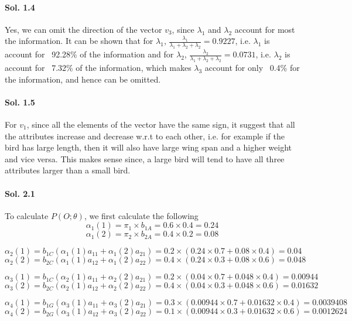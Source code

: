 \documentclass[]{report}
\begin{document}
\paragraph{Sol. 1.4}
	Yes, we can omit the direction of the vector $v_3$, since $\lambda_1$ and $\lambda_2$ account for most the information. It can be shown that
	for $\lambda_1$, $\frac{\lambda_1}{\lambda_1 + \lambda_2 + \lambda_2} = 0.9227$, i.e. $\lambda_1$ is account for ~92.28\% of the information and for 
	$\lambda_2$, $\frac{\lambda_2}{\lambda_1 + \lambda_2 + \lambda_2} = 0.0731$, i.e. $\lambda_2$ is account for ~7.32\% of the information, which makes $\lambda_3$
	account for only ~0.4\% for the information, and hence can be omitted.


\paragraph{Sol. 1.5}
	For $v_1$, since all the elements of the vector have the same sign, it suggest that all the attributes increase and decrease w.r.t to each other, i.e. for example if the bird has large length, then it will also have large wing span and a higher weight and vice versa. This makes sense since, a large bird will tend to have all three attributes larger than a small bird.

\paragraph{Sol. 2.1}
	To calculate $P(O;\theta)$, we first calculate the following
	\[ \alpha_1(1) = \pi_1 \times b_{1A}  = 0.6 \times 0.4 = 0.24 \]
	\[ \alpha_1(2) = \pi_2 \times b_{2A}  = 0.4 \times 0.2 = 0.08 \]
	
	\[ \alpha_2(1) = b_{1C} (\alpha_1 (1) a_{11} + \alpha_1(2) a_{21}) = 0.2 \times (0.24 \times 0.7 + 0.08 \times 0.4) = 0.04 \]
	\[ \alpha_2(2) = b_{2C} (\alpha_1 (1) a_{12} + \alpha_1(2) a_{22}) = 0.4 \times (0.24 \times 0.3 + 0.08 \times 0.6) = 0.048 \]

	\[ \alpha_3(1) = b_{1C} (\alpha_2 (1) a_{11} + \alpha_2(2) a_{21}) = 0.2 \times (0.04 \times 0.7 + 0.048 \times 0.4) = 0.00944 \]
	\[ \alpha_3(2) = b_{2C} (\alpha_2 (1) a_{12} + \alpha_2(2) a_{22}) = 0.4 \times (0.04 \times 0.3 + 0.048 \times 0.6) = 0.01632 \]

	\[ \alpha_4(1) = b_{1G} (\alpha_3 (1) a_{11} + \alpha_3 (2) a_{21}) = 0.3 \times (0.00944 \times 0.7 + 0.01632 \times 0.4) = 0.0039408 \]
	\[ \alpha_4(2) = b_{2G} (\alpha_3 (1) a_{12} + \alpha_3(2) a_{22}) = 0.1 \times (0.00944 \times 0.3 + 0.01632 \times 0.6) = 0.0012624 \]
\end{document}

